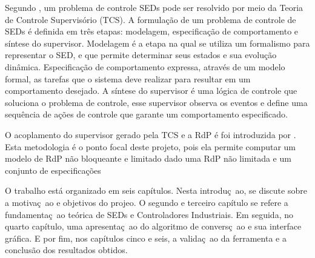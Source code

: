 
Segundo \cite{Montgomery2004}, um problema de controle SEDs pode ser resolvido por meio da Teoria de Controle Supervis\'orio (TCS). A formula\c{c}\~ao de um problema de controle de SEDs \'e definida em tr\^es etapas: modelagem, especifica\c{c}\~ao de comportamento e s\'intese do supervisor. Modelagem \'e a etapa na qual se utiliza um formalismo para representar o SED, e que permite determinar seus estados e sua evolu\c{c}\~ao din\^amica. Especifica\c{c}\~ao de comportamento expressa, atrav\'es de um modelo formal, as tarefas que o sistema deve realizar para resultar em um comportamento desejado. A s\'intese do supervisor \'e uma l\'ogica de controle que soluciona o problema de controle, esse supervisor observa os eventos e define uma sequ\^encia de a\c{c}\~oes de controle que garante um comportamento especificado.

O acoplamento do supervisor gerado pela TCS e a RdP \'e foi introduzida por \cite{UzamWonham2005}. Esta metodologia \'e o ponto focal deste projeto, pois ela permite computar um modelo de RdP n\~ao bloqueante e limitado dado uma RdP n\~ao limitada e um conjunto de especifica\c{c}\~oes \cite{UzamWonham2005}






O trabalho est\'a organizado em seis cap\'itulos. Nesta introdu\c{c}~ao, se discute sobre a motiva\c{c}~ao e objetivos do projeo. O segundo e terceiro cap\'itulo se refere a fundamenta\c{c}~ao te\'orica de SEDs e Controladores Industriais. Em seguida, no quarto cap\'itulo, uma apresenta\c{c}~ao do algoritmo de convers\c{c}~ao e sua interface gr\'afica. E por fim, nos cap\'itulos cinco e seis, a valida\c{c}~ao da ferramenta e a conclus\~ao dos resultados obtidos.


